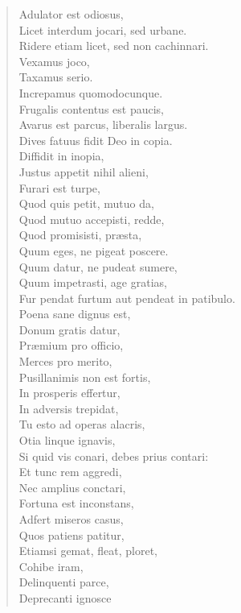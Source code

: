 \begin{verse}
  Adulator est odiosus,\\
  Licet interdum jocari, sed urbane.\\
  Ridere etiam licet, sed non cachinnari.\\
  Vexamus joco,\\
  Taxamus serio.\\
  Increpamus quomodocunque.\\
  Frugalis contentus est paucis,\\
  Avarus est parcus, liberalis largus.\\
  Dives fatuus fidit Deo in copia.\\
  Diffidit in inopia,\\
  Justus appetit nihil alieni,\\
  Furari est turpe,\\
  Quod quis petit, mutuo da,\\
  Quod mutuo accepisti, redde,\\
  Quod promisisti, præsta,\\
  Quum eges, ne pigeat poscere.\\
  Quum datur, ne pudeat sumere,\\
  Quum impetrasti, age gratias,\\
  Fur pendat furtum aut pendeat in patibulo.\\
  Poena sane dignus est,\\
  Donum gratis datur,\\
  Præmium pro officio,\\
  Merces pro merito,\\
  Pusillanimis non est fortis,\\
  In prosperis effertur,\\
  In adversis trepidat,\\
  Tu esto ad operas alacris,\\
  Otia linque ignavis,\\
  Si quid vis conari, debes prius contari:\\
  Et tunc rem aggredi,\\
  Nec amplius conctari,\\
  Fortuna est inconstans,\\
  Adfert miseros casus,\\
  Quos patiens patitur,\\
  Etiamsi gemat, fleat, ploret,\\
  Cohibe iram,\\
  Delinquenti parce,\\
  Deprecanti ignosce\\

\end{verse}
